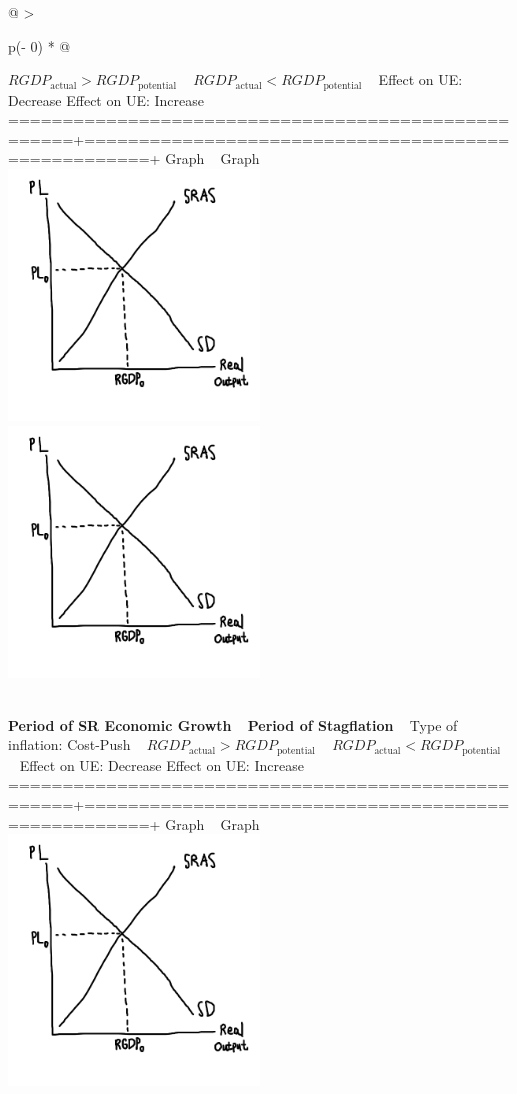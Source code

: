\documentclass[
  letterpaper,
  DIV=11,
  numbers=noendperiod]{scrartcl}
\begin{document}
\begin{longtable}[]{@{}
  >{\raggedright\arraybackslash}p{(\columnwidth - 0\tabcolsep) * }@{}}
\begin{minipage}[t]{\linewidth}
\(RGDP_{\text{actual}} > RGDP_{\text{potential}}\) ~\textbar{}
\(RGDP_{\text{actual}} < RGDP_{\text{potential}}\) ~\textbar{} Effect on
UE: Decrease \textbar{} Effect on UE: Increase \textbar{}
====================================================+====================================================+
Graph ~ \textbar{} Graph ~ \textbar{}
\includegraphics[width=0.5\textwidth,height=\textheight]{img/agg-model.png}
\textbar{}
\includegraphics[width=0.5\textwidth,height=\textheight]{img/agg-model.png}
\end{minipage} \\
\textbf{Period of SR Economic Growth} ~ \textbar{} \textbf{Period of
Stagflation} ~ \textbar{} \textbar{} Type of inflation: Cost-Push ~
\textbar{} \(RGDP_{\text{actual}} > RGDP_{\text{potential}}\)
~\textbar{} \(RGDP_{\text{actual}} < RGDP_{\text{potential}}\)
~\textbar{} Effect on UE: Decrease \textbar{} Effect on UE: Increase
\textbar{}
====================================================+====================================================+
Graph ~ \textbar{} Graph ~ \textbar{}
\includegraphics[width=0.5\textwidth,height=\textheight]{img/agg-model.png}

\end{longtable}
\end{document}
